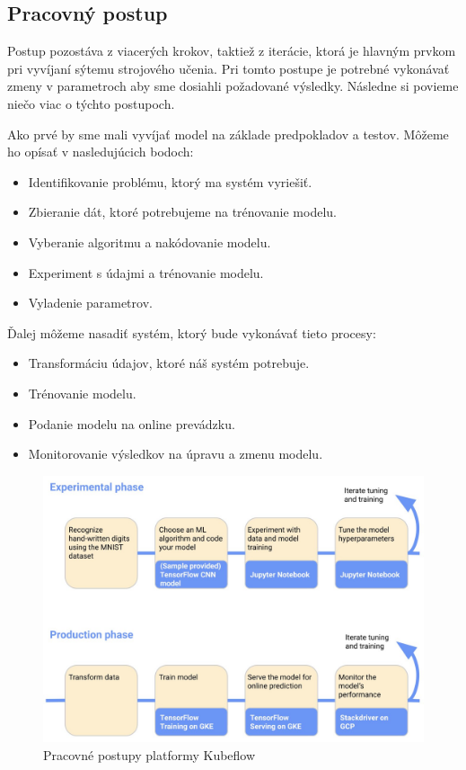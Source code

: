\subsection{Pracovný postup}

Postup pozostáva z viacerých krokov, taktiež z iterácie, ktorá je hlavným prvkom pri vyvíjaní sýtemu strojového učenia. Pri tomto postupe je potrebné vykonávať zmeny v parametroch aby sme dosiahli požadované výsledky. Následne si povieme niečo viac o týchto postupoch.

Ako prvé by sme mali vyvíjať model na základe predpokladov a testov. Môžeme ho opísať v nasledujúcich bodoch: \cite{work}

\begin{itemize}
    \item Identifikovanie problému, ktorý ma systém vyriešiť.
    \item Zbieranie dát, ktoré potrebujeme na trénovanie modelu.
    \item Vyberanie algoritmu a nakódovanie modelu.
    \item Experiment s údajmi a trénovanie modelu.
	\item Vyladenie parametrov.
\end{itemize}

Ďalej môžeme nasadiť systém, ktorý bude vykonávať tieto procesy:

\begin{itemize}
    \item Transformáciu údajov, ktoré náš systém potrebuje.
	\item Trénovanie modelu.
	\item Podanie modelu na online prevádzku.
	\item Monitorovanie výsledkov na úpravu a zmenu modelu.
\end{itemize}

\begin{figure}[!h]
    \centering
    \includegraphics[width=1\linewidth]{figures/kubeflowwork}
    \caption{Pracovné postupy platformy Kubeflow \cite{work}}
\end{figure}

